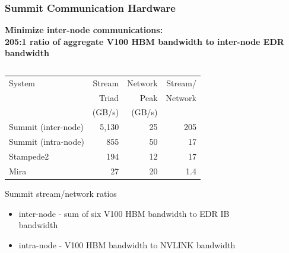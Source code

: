 \documentclass[aspectratio=169]{beamer}
\begin{document}
\begin{frame}
  \frametitle{Summit Communication Hardware}
  \textbf{Minimize inter-node communications:\\
  205:1 ratio of aggregate V100 HBM bandwidth to inter-node EDR bandwidth}
    \begin{columns}
    \begin{column}{0.7\textwidth}
      \begin{table}[]
        \begin{tabular}{lrrr}
        System                & Stream & Network & Stream/ \\
                              & Triad  & Peak    & Network \\
                              & (GB/s) & (GB/s)  & \\
        Summit (inter-node)   & 5,130  & 25      & 205     \\
        Summit (intra-node)   & 855    & 50      & 17      \\
        Stampede2             & 194    & 12      & 17      \\
        Mira                  & 27     & 20      & 1.4
        \end{tabular}
      \end{table}
      {\small
        Summit stream/network ratios
        \begin{itemize}
          \item inter-node - sum of six V100 HBM bandwidth to EDR IB bandwidth
          \item intra-node - V100 HBM bandwidth to NVLINK bandwidth
        \end{itemize}
      }
    \end{column}
    \begin{column}{0.3\textwidth}
      \begin{figure}
        \centering

\end{figure}
\end{column}
\end{columns}
\end{frame}
\end{document}
